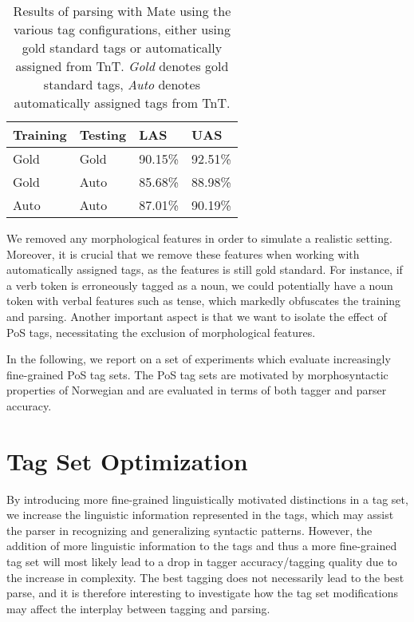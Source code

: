 \documentclass[11pt,a4paper]{article}
\begin{document}
\begin{table}
    \centering
    \smaller[0.5]
    \begin{tabular}{@{}llll@{}}
        \toprule
        \textbf{Training} & \textbf{Testing} & \textbf{LAS} & \textbf{UAS} \\
        \midrule
        Gold & Gold & 90.15\% & 92.51\% \\
        Gold & Auto & 85.68\% & 88.98\% \\
        Auto & Auto & 87.01\% & 90.19\% \\
        \bottomrule
    \end{tabular}
    \caption{Results of parsing with Mate using the various tag configurations,
        either using gold standard tags or automatically assigned from TnT.
        \emph{Gold} denotes gold standard tags, \emph{Auto} denotes
        automatically assigned tags from TnT.}
    \label{tagconfigeval}
\end{table}

We removed any morphological features in order to simulate a realistic setting.
Moreover, it is crucial that we remove these features when working with
automatically assigned tags, as the features is still gold standard.  For
instance, if a verb token is erroneously tagged as a noun, we could potentially
have a noun token with verbal features such as tense, which markedly obfuscates
the training and parsing. Another important aspect is that we want to isolate
the effect of PoS tags, necessitating the exclusion of morphological features.

In the following, we report on a set of experiments which evaluate increasingly
fine-grained PoS tag sets. The PoS tag sets are motivated by morphosyntactic
properties of Norwegian and are evaluated in terms of both tagger and parser
accuracy.

\section{Tag Set Optimization}
\label{sec:optimization}
By introducing more fine-grained linguistically motivated distinctions in a tag
set, we increase the linguistic information represented in the tags, which may
assist the parser in recognizing and generalizing syntactic patterns. However,
the addition of more linguistic information to the tags and thus a more
fine-grained tag set will most likely lead to a drop in tagger accuracy/tagging
quality due to the increase in complexity. The best tagging does not
necessarily lead to the best parse, and it is therefore interesting to
investigate how the tag set modifications may affect the interplay between
tagging and parsing.
\end{document}
